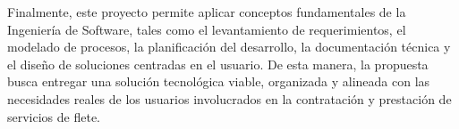 Finalmente, este proyecto permite aplicar conceptos fundamentales de la Ingeniería de Software, tales como el levantamiento de requerimientos, el modelado de procesos, la planificación del desarrollo, la documentación técnica y el diseño de soluciones centradas en el usuario. De esta manera, la propuesta busca entregar una solución tecnológica viable, organizada y alineada con las necesidades reales de los usuarios involucrados en la contratación y prestación de servicios de flete.

